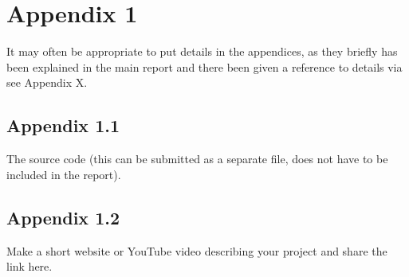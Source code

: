 \appendix

\chapter{Appendix 1} %
It may often be appropriate to put details in the appendices, as they briefly has been explained in the main report and there been given a reference to details via see Appendix X.

\begin{subappendices}

\section{Appendix 1.1 }
The source code (this can be submitted as a separate file, does not have to be included in the report).

\section{Appendix 1.2}
Make a short website or  YouTube video describing your project and share the link here.
\end{subappendices}
